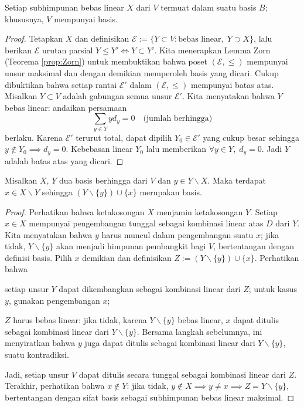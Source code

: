 \begin{proposition}\label{prop:existence-basis}
	Setiap subhimpunan bebas linear $X$ dari $V$ termuat dalam suatu basis $B$; khususnya, $V$ mempunyai basis.
\end{proposition}
\begin{proof}
	Tetapkan $X$ dan definisikan $\mathcal{E} := \{Y \subset V: \text{bebas linear}, \; Y \supset X  \}$, lalu berikan $\mathcal{E}$ urutan parsial $Y \leq Y' \iff Y \subset Y'$. Kita menerapkan Lemma Zorn (Teorema \ref{prop:Zorn}) untuk membuktikan bahwa poset $(\mathcal{E}, \leq)$ mempunyai unsur maksimal dan dengan demikian memperoleh basis yang dicari. Cukup dibuktikan bahwa setiap rantai $\mathcal{E}'$ dalam $(\mathcal{E}, \leq)$ mempunyai batas atas. Misalkan $Y \subset V$ adalah gabungan semua unsur $\mathcal{E}'$. Kita menyatakan bahwa $Y$ bebas linear: andaikan persamaan
	\[ \sum_{y \in Y} y d_y = 0 \quad \text{(jumlah berhingga)} \]
berlaku. Karena $\mathcal{E}'$ terurut total, dapat dipilih $Y_0 \in \mathcal{E}'$ yang cukup besar sehingga $y \notin Y_0 \implies d_y = 0$. Kebebasan linear $Y_0$ lalu memberikan $\forall y \in Y, \; d_y = 0$. Jadi $Y$ adalah batas atas yang dicari.
\end{proof}

\begin{lemma}\label{prop:exchange-vector-space}
	Misalkan $X$, $Y$ dua basis berhingga dari $V$ dan $y \in Y \smallsetminus X$. Maka terdapat $x \in X \smallsetminus Y$ sehingga $(Y \smallsetminus \{y\}) \cup \{x\}$ merupakan basis.
\end{lemma}
\begin{proof}
	Perhatikan bahwa ketakosongan $X$ menjamin ketakosongan $Y$. Setiap $x \in X$ mempunyai pengembangan tunggal sebagai kombinasi linear atas $D$ dari $Y$. Kita menyatakan bahwa $y$ harus muncul dalam pengembangan suatu $x$; jika tidak, $Y \smallsetminus \{y\}$ akan menjadi himpunan pembangkit bagi $V$, bertentangan dengan definisi basis. Pilih $x$ demikian dan definisikan $Z := (Y \smallsetminus \{y\}) \cup \{x\}$. Perhatikan bahwa
	\begin{inparaenum}[(a)]
		\item setiap unsur $Y$ dapat dikembangkan sebagai kombinasi linear dari $Z$; untuk kasus $y$, gunakan pengembangan $x$;
		\item $Z$ harus bebas linear: jika tidak, karena $Y \smallsetminus \{y\}$ bebas linear, $x$ dapat ditulis sebagai kombinasi linear dari $Y \smallsetminus \{y\}$. Bersama langkah sebelumnya, ini menyiratkan bahwa $y$ juga dapat ditulis sebagai kombinasi linear dari $Y \smallsetminus \{y\}$, suatu kontradiksi.
	\end{inparaenum}
	Jadi, setiap unsur $V$ dapat ditulis secara tunggal sebagai kombinasi linear dari $Z$. Terakhir, perhatikan bahwa $x \notin Y$: jika tidak, $y \notin X \implies y \neq x \implies Z = Y \smallsetminus \{y\}$, bertentangan dengan sifat basis sebagai subhimpunan bebas linear maksimal.
\end{proof}

